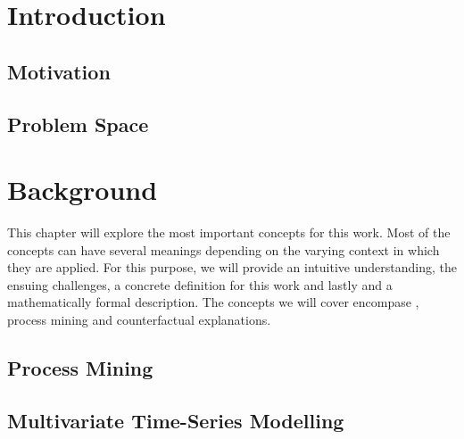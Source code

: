 \documentclass[12pt,a4paper]{report}
\begin{document}




\tableofcontents
\printglossary[type=acronym, title=List of terms, toctitle=List of terms]


\chapter{Introduction}
\label{sec:intro}

\section{Motivation}
\label{sec:motivation}


\section{Problem Space}
\label{sec:challenges}



\chapter{Background}
\label{sec:prereq}
This chapter will explore the most important concepts for this work. Most of the concepts can have several meanings depending on the varying context in which they are applied. For this purpose, we will provide an intuitive understanding, the ensuing challenges, a concrete definition for this work and lastly and a mathematically formal description. The concepts we will cover encompase , process mining and counterfactual explanations.


\section{Process Mining}
\label{sec:process}


\section{Multivariate Time-Series Modelling}
\label{sec:sequences}

\end{document}
